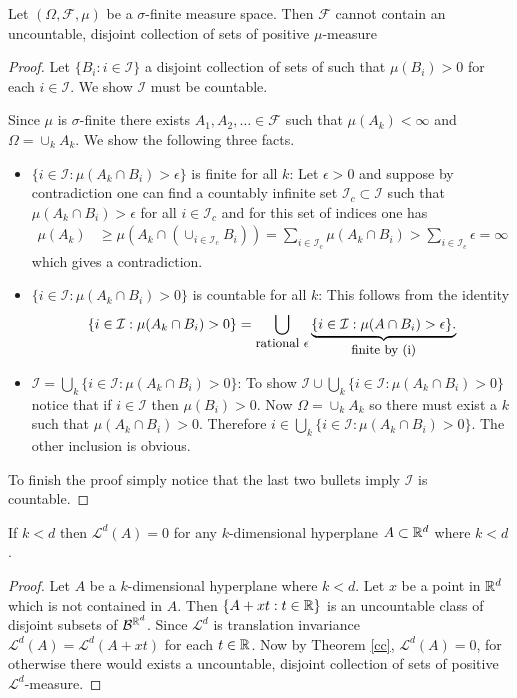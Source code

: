 \begin{theorem}
\label{cc}
Let $(\Omega, \mathcal F,\mu)$ be a $\sigma$-finite measure space. Then $\mathcal F$ cannot contain an uncountable, disjoint collection of sets of positive $\mu$-measure
\end{theorem}
\begin{proof}
Let $\{B_i: i\in \mathcal I\}$ a disjoint collection of sets of such that $\mu(B_i)>0$ for each $i\in\mathcal I$.
We show $\mathcal I$ must be countable.


Since $\mu$ is $\sigma$-finite there exists $A_1,A_2,\ldots \in\mathcal F$ such that $\mu(A_k)<\infty$ and $\Omega = \cup_k A_k$.  We show the following three facts.
\begin{itemize}
\item $\{ i\in \mathcal I: \mu(A_k\cap B_i)>\epsilon\}$ is finite for all $k$:
Let $\epsilon>0$ and suppose by contradiction one can find a countably infinite set  $\mathcal I_c\subset \mathcal I$ such that $\mu(A_k\cap B_i)>\epsilon $ for all $i\in \mathcal I_c$ and for this set of indices one has
\begin{align*}
\mu(A_k)&\geq \mu(A_k\cap (\cup_{i\in\mathcal I_c}B_i ))= \sum_{i\in\mathcal I_c}\mu(A_k\cap B_i) > \sum_{i\in\mathcal I_c}\epsilon =\infty
\end{align*}
which gives a contradiction.
\item $\{ i\in \mathcal I: \mu(A_k\cap B_i)>0\}$ is countable for all $k$:
This follows from the  identity
\[\{ i\in \mathcal I: \mu(A_k\cap B_i)>0\}=\bigcup_\text{\small rational
$\epsilon$} \underbrace{\{ i\in \mathcal I: \mu(A\cap B_i)>\epsilon\}.} _\text{\small finite by (i)}   \]
\item $\mathcal I = \bigcup_k \{ i\in \mathcal I: \mu(A_k\cap B_i)>0\}$:
 To show $\mathcal I \cup \bigcup_k \{ i\in \mathcal I: \mu(A_k\cap B_i)>0\}$ notice that  if $i\in\mathcal I$ then $\mu(B_i)>0$. Now  $\Omega =\cup_k A_k$ so there must exist a $k$ such that $\mu(A_k\cap B_i)>0$.  Therefore $i\in  \bigcup_k \{ i\in \mathcal I: \mu(A_k\cap B_i)>0\}$. The other inclusion is obvious.
\end{itemize}

 To finish the proof simply notice that the last two bullets imply $\mathcal I$ is countable.
\end{proof}


\begin{corollary}If $k<d$ then
$\mathcal L^d(A)=0$ for any $k$-dimensional hyperplane $A\subset \Bbb R^d$ where $k<d$.
\end{corollary}
\begin{proof}
Let $A$ be a $k$-dimensional hyperplane where $k<d$. Let $x$ be a point in $\Bbb R^d$ which is not  contained in $A$.
Then $\{A+xt: t\in\Bbb R\}$ is an uncountable class of disjoint subsets of $\mathcal B^{\Bbb R^d}$. Since $\mathcal L^d$ is translation invariance $\mathcal L^d(A) = \mathcal L^d(A+xt)$ for each $t\in\Bbb R$. Now by Theorem \ref{cc}, $\mathcal L^d(A)=0$, for otherwise there would exists a uncountable, disjoint collection of sets of positive $\mathcal L^d$-measure.
\end{proof}






